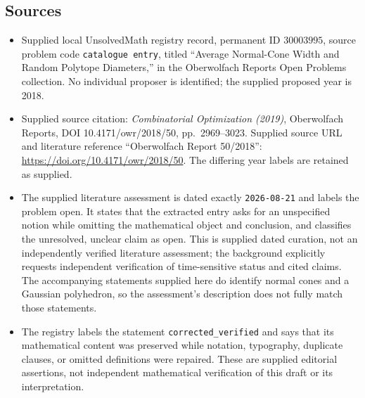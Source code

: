 \documentclass[11pt]{article}
\begin{document}
\subsection{Sources}
\begin{itemize}
\item Supplied local UnsolvedMath registry record, permanent ID \(30003995\), source problem code \texttt{catalogue entry}, titled ``Average Normal-Cone Width and Random Polytope Diameters,'' in the Oberwolfach Reports Open Problems collection. No individual proposer is identified; the supplied proposed year is 2018.
\item Supplied source citation: \emph{Combinatorial Optimization (2019)}, Oberwolfach Reports, DOI 10.4171/owr/2018/50, pp.\ 2969--3023. Supplied source URL and literature reference ``Oberwolfach Report 50/2018'': \url{https://doi.org/10.4171/owr/2018/50}. The differing year labels are retained as supplied.
\item The supplied literature assessment is dated exactly \texttt{2026-08-21} and labels the problem open. It states that the extracted entry asks for an unspecified notion while omitting the mathematical object and conclusion, and classifies the unresolved, unclear claim as open. This is supplied dated curation, not an independently verified literature assessment; the background explicitly requests independent verification of time-sensitive status and cited claims. The accompanying statements supplied here do identify normal cones and a Gaussian polyhedron, so the assessment's description does not fully match those statements.
\item The registry labels the statement \texttt{corrected\_verified} and says that its mathematical content was preserved while notation, typography, duplicate clauses, or omitted definitions were repaired. These are supplied editorial assertions, not independent mathematical verification of this draft or its interpretation.
\end{itemize}
\end{document}
